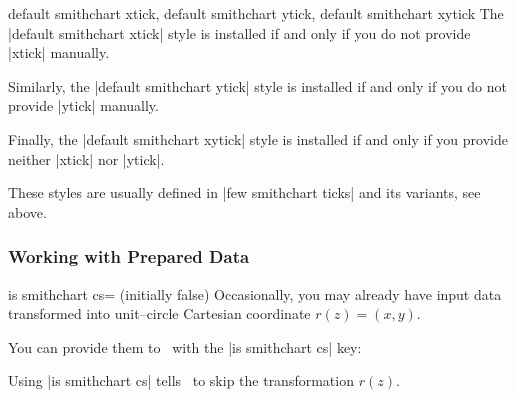 \begin{pgfplotskeylist}{%
	default smithchart xtick,%
	default smithchart ytick,%
	default smithchart xytick}
	The |default smithchart xtick| style is installed if and only if you do not provide |xtick| manually.

	Similarly, the |default smithchart ytick| style is installed if and only if you do not provide |ytick| manually.

	Finally, the |default smithchart xytick| style is installed if and only if you provide neither |xtick| nor |ytick|.

	These styles are usually defined in |few smithchart ticks| and its variants, see above.
\end{pgfplotskeylist}

\subsubsection{Working with Prepared Data}
\begin{pgfplotskey}{is smithchart cs= (initially false)}
	Occasionally, you may already have input data transformed into unit--circle Cartesian coordinate $r(z) = (x,y)$.

	You can provide them to \PGFPlots\ with the |is smithchart cs| key:
\begin{codeexample}[]
\end{codeexample}
	Using |is smithchart cs| tells \PGFPlots\ to skip the transformation $r(z)$.
\end{pgfplotskey}

